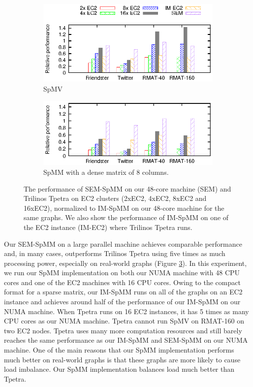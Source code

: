 \begin{figure}
	\footnotesize
	\centering
	\begin{subfigure}[b]{0.5\textwidth}
		\centering
		\includegraphics[scale=1]{SpMM_figs/SpMV-EC2.eps}
		\vspace{-5pt}
		\caption{SpMV}
		\label{perf:ec2:spmv}
	\end{subfigure}
	\begin{subfigure}[b]{0.5\textwidth}
		\centering
		\includegraphics[scale=1]{SpMM_figs/SpMM-EC2.eps}
		\vspace{-5pt}
		\caption{SpMM with a dense matrix of 8 columns.}
		\label{perf:ec2:spmm8}
	\end{subfigure}
	\vspace{3pt}
	\caption{The performance of SEM-SpMM on our 48-core machine (SEM) and
		Trilinos Tpetra on EC2 clusters (2xEC2, 4xEC2, 8xEC2 and 16xEC2),
		normalized to IM-SpMM on our 48-core machine for the same graphs.
		We also show the performance of IM-SpMM on
	one of the EC2 instance (IM-EC2) where Trilinos Tpetra runs.}
	\label{perf:ec2}
\end{figure}

Our SEM-SpMM on a large parallel machine achieves comparable performance
and, in many cases, outperforms Trilinos Tpetra using five times
as much processing power, especially on
real-world graphs (Figure \ref{perf:ec2}). In this experiment, we run our
SpMM implementation on both our NUMA machine with 48 CPU cores
and one of the EC2 machines with 16 CPU cores. Owing to the compact format
for a sparse matrix, our IM-SpMM runs on all of the graphs on an EC2 instance
and achieves around half of the performance of our IM-SpMM on our NUMA machine.
When Tpetra runs on 16 EC2 instances, it has 5 times as many CPU cores as our
NUMA machine. Tpetra cannot run SpMV on RMAT-160 on two EC2 nodes.
Tpetra uses many more computation resources and still barely reaches
the same performance as our IM-SpMM and SEM-SpMM on our NUMA machine. One of
the main reasons that our SpMM implementation performs much
better on real-world graphs is that these graphs are more likely to cause
load imbalance. Our SpMM implementation balances load much better than Tpetra.

